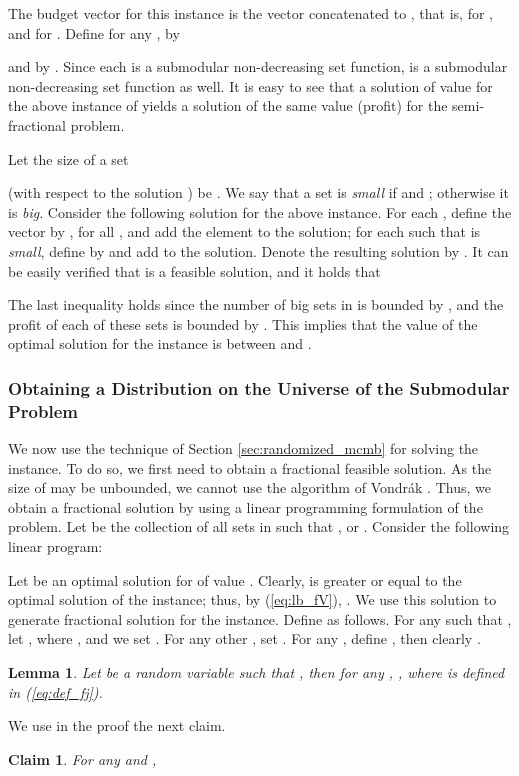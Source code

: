 \documentclass[11pt]{article}
\newtheorem{lemma}[theorem]{Lemma}
\newtheorem{claim}{Claim}[section]
\begin{document}
{The budget vector  for this instance is the vector 
concatenated to ,
that is,  for , and 
for .
Define  for any ,
by

and    by .
Since each  is a submodular non-decreasing set function,  is
a submodular non-decreasing set function as well.
It is easy to see  that a solution of value  for the above instance of
  yields a solution of the same value (profit) for the
semi-fractional problem.

Let the size of a set

(with respect to the solution )
be . We say that
a set  is \emph{small} if
 and ; otherwise it is
{\em big}.
Consider the following solution for the above  instance.
For each , define the vector  by ,
for all , and add
the element  to the solution; for each
 such that  is {\em small},
define  by  and add  to the solution.
Denote the resulting solution by .
It can be easily verified that  is a feasible solution,
and it holds that

The last inequality holds since the number of big sets in 
is bounded by , and the profit of each of these
 sets is bounded by . This implies that the value of the optimal
solution for the  instance
 is between  and .

\subsubsection{Obtaining a Distribution on the Universe of the Submodular
Problem}
We now use the technique of Section \ref{sec:randomized_mcmb}
for solving the  instance. To do so, we first need to obtain a fractional
feasible solution. As the size of  may be unbounded, we cannot
use the algorithm of Vondr\'{a}k \cite{Vo08}. Thus, we obtain a fractional
solution by using
a linear programming formulation of the problem. Let 
be the collection of all sets  in  such that ,
or
.
Consider the following linear program:




Let  be an optimal solution for  of value
. Clearly,  is greater or equal to the
optimal solution of the  instance; thus, by (\ref{eq:lb_fV}),
. We use this solution to
generate fractional solution for the  instance. Define  as follows.
For any  such that , let ,
where ,
and we set
. For any other , set .
For any ,
define , then clearly
.
\begin{lemma}
\label{lp_round1}
Let  be a random variable such that
, then for any , , where  is defined in (\ref{eq:def_fj}).
\end{lemma}
We use in the proof the next claim.
\begin{claim}
\label{claim:lb_Yj_claim}
For any  and ,


\end{claim}}
\end{document}
